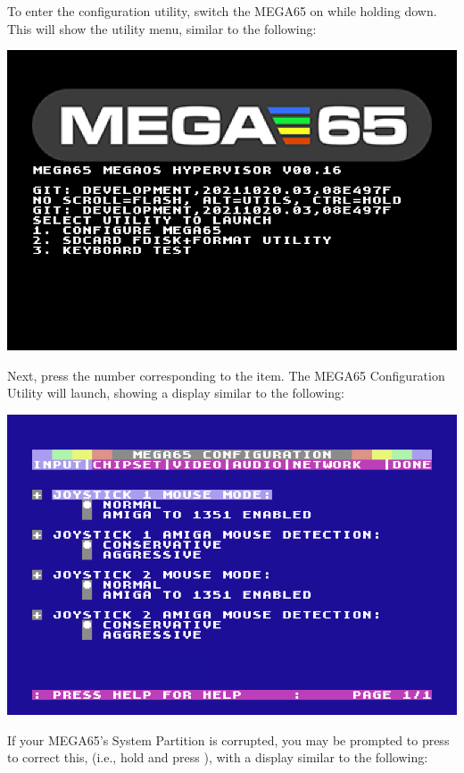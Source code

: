   To enter the configuration utility, switch the MEGA65 on while
  holding  down.  This will show the utility menu,
  similar to the following:

\begin{center}
  \includegraphics[width=0.7\linewidth]{images/ss-utilmenu.png}
\end{center}

  Next, press the number corresponding to the  item.  The MEGA65
  Configuration Utility will launch, showing a display similar to
  the following:

\begin{center}
  \includegraphics[width=0.7\linewidth]{images/ss-m65config-1.png}
\end{center}

  If your MEGA65's System Partition is corrupted, you may be
  prompted to press  to correct this, (i.e., hold  and press
  ), with a display similar to the following:

